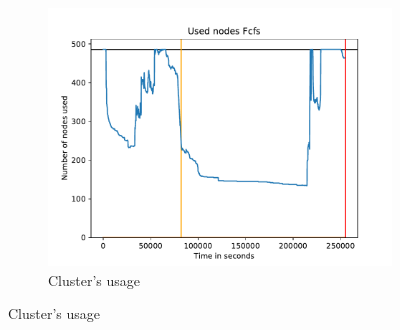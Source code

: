 \documentclass[a4paper]{article}
\begin{document}
\begin{figure}[H]\centering
\begin{subfigure}[b]{0.4\linewidth}\centering\includegraphics[width=1\linewidth]{MBSS/plot/2022-02-02->2022-02-03_V9271_Fcfs_Used_nodes_450_128_32_256_4_1024.pdf}\caption{Cluster's usage}\end{subfigure}

\end{figure}
\end{document}
